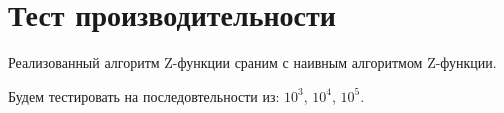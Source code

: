 \section{Тест производительности}

Реализованный алгоритм Z-функции сраним с наивным алгоритмом Z-функции.

Будем тестировать на последовтельности из: $10^3$, $10^4$, $10^5$.


\begin{alltt}

\end{alltt}


\pagebreak
